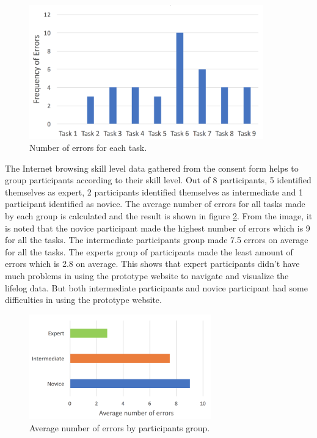 \documentclass[mscthesis]{usiinfthesis}
\begin{document}
\begin{figure}[!ht]
  \centering
  \includegraphics[width=0.9\textwidth]{wbE}
  \caption{Number of errors for each task.}
  \label{fig18}
\end{figure}

The Internet browsing skill level data gathered from the consent form helps to group participants according to their skill level. Out of 8 participants, 5 identified themselves as expert, 2 participants identified themselves as intermediate and 1 participant identified as novice. The average number of errors for all tasks made by each group is calculated and the result is shown in figure \ref{fig19}. From the image, it is noted that the novice participant made the highest number of errors which is 9 for all the tasks. The intermediate participants group made 7.5 errors on average for all the tasks. The experts group of participants made the least amount of errors which is 2.8 on average. This shows that expert participants didn't have much problems in using the prototype website to navigate and visualize the lifelog data. But both intermediate participants and novice participant had some difficulties in using the prototype website.  

\begin{figure}[!ht]
  \centering
  \includegraphics[width=0.7\textwidth]{Ebg}
  \caption{Average number of errors by participants group.}
  \label{fig19}
\end{figure}
\end{document}
